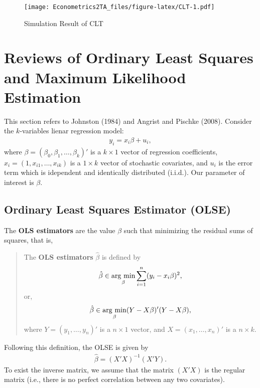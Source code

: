 \documentclass[
  12pt,
]{article}
\begin{document}
\begin{figure}
\centering
\texttt{[image: Econometrics2TA\_files/figure-latex/CLT-1.pdf]}
\caption{\label{fig:CLT}Simulation Result of CLT}
\end{figure}

\hypertarget{reviews-of-ordinary-least-squares-and-maximum-likelihood-estimation}{%
\section{Reviews of Ordinary Least Squares and Maximum Likelihood Estimation}\label{reviews-of-ordinary-least-squares-and-maximum-likelihood-estimation}}

This section refers to Johnston (1984) and Angrist and Pischke (2008).
Consider the \(k\)-variables lienar regression model:
\begin{align*}
  y_i = x_i \beta + u_i,
\end{align*}
where \(\beta = (\beta_0, \beta_1, \ldots, \beta_k)'\) is a \(k \times 1\) vector of regression coefficients,
\(x_i = (1, x_{i1}, \ldots, x_{ik})\) is a \(1 \times k\) vector of stochastic covariates,
and \(u_i\) is the error term which is idependent and identically distributed (i.i.d.).
Our parameter of interest is \(\beta\).

\hypertarget{ordinary-least-squares-estimator-olse}{%
\subsection{Ordinary Least Squares Estimator (OLSE)}\label{ordinary-least-squares-estimator-olse}}

The \textbf{OLS estimators} are the value \(\beta\) such that minimizing the residual sums of squares,
that is,

\begin{quote}
The \textbf{OLS estimators} \(\hat{\beta}\) is defined by
\begin{align*}
\hat{\beta} \in \mathop{\rm arg~min}\limits_{\beta} \sum_{i = 1}^n (y_i - x_i \beta)^2,
\end{align*}
or,
\begin{align*}
\hat{\beta} \in \mathop{\rm arg~min}\limits_{\beta} (Y - X \beta)'(Y - X \beta),
\end{align*}
where \(Y = (y_1, \ldots, y_n)'\) is a \(n \times 1\) vector, and
\(X = (x_1, \ldots, x_n)'\) is a \(n \times k\).
\end{quote}

Following this definition, the OLSE is given by
\begin{align*}
  \hat{\beta} = (X'X)^{-1}(X'Y).
\end{align*}
To exist the inverse matrix, we assume that the matrix \((X'X)\) is the regular matrix
(i.e., there is no perfect correlation between any two covariates).
\end{document}
